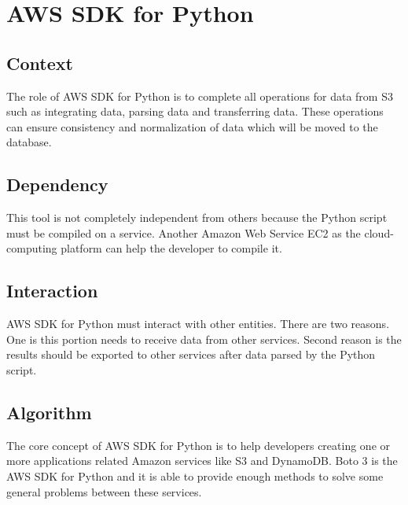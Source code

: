  \section{AWS SDK for Python}
	\subsection{Context}
    The role of AWS SDK for Python is to complete all operations for data from S3 such as integrating data, parsing data and transferring data. These operations can ensure consistency and normalization of data which will be moved to the database.  
        
	\subsection{Dependency}
    This tool is not completely independent from others because the Python script must be compiled on a service. Another Amazon Web Service EC2 as the cloud-computing platform can help the developer to compile it. 
    
	\subsection{Interaction}
    AWS SDK for Python must interact with other entities. There are two reasons. One is this portion needs to receive data from other services. Second reason is the results should be exported to other services after data parsed by the Python script.

	\subsection{Algorithm}
    The core concept of AWS SDK for Python is to help developers creating one or more applications related Amazon services like S3 and DynamoDB. Boto 3 is the AWS SDK for Python and it is able to provide enough methods to solve some general problems between these services.
    
